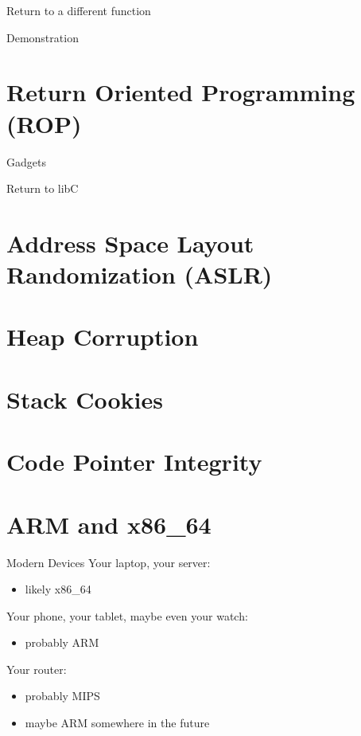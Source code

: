 \documentclass[beamer]{uibk}
\begin{document}
\begin{frame}{Return to a different function}
    \begin{center}
        \huge Demonstration
    \end{center}
\end{frame}

\section{Return Oriented Programming (ROP)}

\begin{frame}{Gadgets}

\end{frame}

\begin{frame}{Return to libC}

\end{frame}

\section{Address Space Layout Randomization (ASLR)}

\section{Heap Corruption}

\section{Stack Cookies}

\section{Code Pointer Integrity}

\section{ARM and x86\_64}

\begin{frame}{Modern Devices}
    Your laptop, your server:
    \begin{itemize}
        \item likely x86\_64
    \end{itemize}
    \medskip
    \pause
    Your phone, your tablet, maybe even your watch:
    \begin{itemize}
        \item probably ARM
    \end{itemize}
    \medskip
    \pause
    Your router:
    \begin{itemize}
        \item probably MIPS
        \item maybe ARM somewhere in the future
    \end{itemize}
\end{frame}
\end{document}
